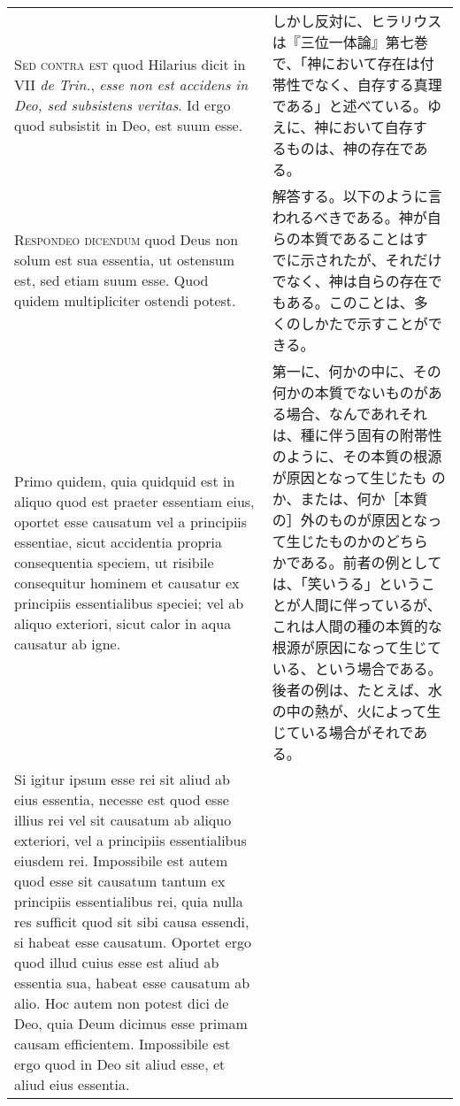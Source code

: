 \documentclass[10pt]{jsarticle}
\begin{document}
\begin{longtable}{p{21em}p{21em}}
\\

\textsc{Sed contra est} quod Hilarius dicit in VII \textit{de Trin.},
\textit{esse non est accidens in Deo, sed subsistens veritas}.  Id
ergo quod subsistit in Deo, est suum esse.

&

しかし反対に、ヒラリウスは『三位一体論』第七巻で、「神において存在は付
帯性でなく、自存する真理である」と述べている。ゆえに、神において自存す
るものは、神の存在である。

\\

\textsc{Respondeo dicendum} quod Deus non solum est sua essentia, ut
ostensum est, sed etiam suum esse.  Quod quidem multipliciter ostendi
potest.

&

解答する。以下のように言われるべきである。神が自らの本質であることはす
でに示されたが、それだけでなく、神は自らの存在でもある。このことは、多
くのしかたで示すことができる。

\\

Primo quidem, quia quidquid est in aliquo quod est praeter essentiam
eius, oportet esse causatum vel a principiis essentiae, sicut
accidentia propria consequentia speciem, ut risibile consequitur
hominem et causatur ex principiis essentialibus speciei; vel ab aliquo
exteriori, sicut calor in aqua causatur ab igne.  


&

第一に、何かの中に、その何かの本質でないものがある場合、なんであれそれ
は、種に伴う固有の附帯性のように、その本質の根源が原因となって生じたも
のか、または、何か［本質の］外のものが原因となって生じたものかのどちら
かである。前者の例としては、「笑いうる」ということが人間に伴っているが、
これは人間の種の本質的な根源が原因になって生じている、という場合である。
後者の例は、たとえば、水の中の熱が、火によって生じている場合がそれであ
る。

\\


Si igitur ipsum esse rei sit aliud ab eius essentia, necesse est quod
esse illius rei vel sit causatum ab aliquo exteriori, vel a principiis
essentialibus eiusdem rei.  Impossibile est autem quod esse sit
causatum tantum ex principiis essentialibus rei, quia nulla res
sufficit quod sit sibi causa essendi, si habeat esse causatum.
Oportet ergo quod illud cuius esse est aliud ab essentia sua, habeat
esse causatum ab alio.  Hoc autem non potest dici de Deo, quia Deum
dicimus esse primam causam efficientem.  Impossibile est ergo quod in
Deo sit aliud esse, et aliud eius essentia.


\end{longtable}
\end{document}
